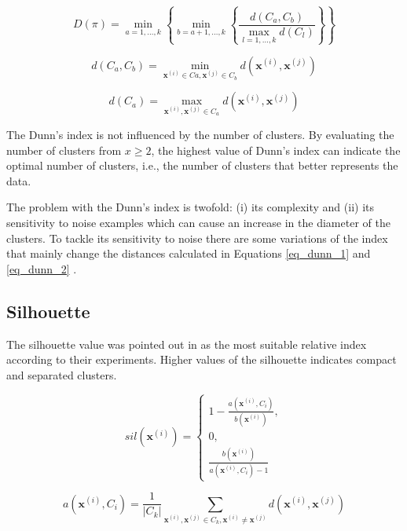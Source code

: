 \begin{equation}
\label{eq_dunn}
    D(\pi)=\min_{a=1,\ldots,k}\left\{\min_{b=a+1,\ldots,k} \left\{\frac{d(C_a,C_b)}{\max_{l=1,\ldots,k} d(C_l)}\right\}\right\}
\end{equation}

\begin{equation}
\label{eq_dunn_1}
    d(C_a,C_b)=\min_{\mathbf{x}^{(i)} \in Ca,\mathbf{x}^{(j)} \in C_b} d(\mathbf{x}^{(i)},\mathbf{x}^{(j)})
\end{equation}
    
\begin{equation}
\label{eq_dunn_2}
    d(C_a)=\max_{\mathbf{x}^{(i)},\mathbf{x}^{(j)} \in C_a} d(\mathbf{x}^{(i)},\mathbf{x}^{(j)})
\end{equation}

The Dunn's index is not influenced by the number of clusters. By evaluating the number of clusters from $x \geq 2$, the highest value of Dunn's index can indicate the optimal number of clusters, i.e., the number of clusters that better represents the data.

The problem with the Dunn's index is twofold: (i) its complexity and (ii) its sensitivity to noise examples which can cause an increase in the diameter of the clusters. To tackle its sensitivity to noise there are some variations of the index that mainly change the distances calculated in Equations \ref{eq_dunn_1} and \ref{eq_dunn_2} \cite{bezdek1998some}.

\subsection{Silhouette}

The silhouette value \cite{rousseeuw1987silhouettes} was pointed out in \cite{Brun07} as the most suitable relative index according to their experiments. Higher values of the silhouette indicates compact and separated clusters. 

\begin{equation}
    sil(\mathbf{x}^{(i)})=\left\{\begin{matrix}1-\frac{a(\mathbf{x}^{(i)},C_i)}{b(\mathbf{x}^{(i)})},
\\ 0,
\\ \frac{b(\mathbf{x}^{(i)})}{a(\mathbf{x}^{(i)},C_i)-1}
\end{matrix}\right.
\end{equation}

\begin{equation}
a(\mathbf{x}^{(i)},C_i)=\frac{1}{|C_k|}\sum_{\mathbf{x}^{(i)},\mathbf{x}^{(j)} \in C_k, \mathbf{x}^{(i)} \neq \mathbf{x}^{(j)}} d(\mathbf{x}^{(i)}, \mathbf{x}^{(j)})     
\end{equation}

